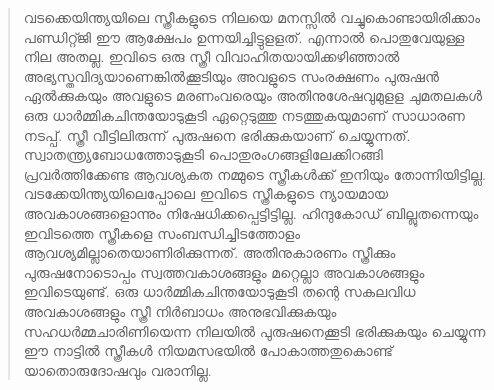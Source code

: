 \begin{quotation}
\noindent വടക്കെയിന്ത്യയിലെ സ്ത്രീകളുടെ നിലയെ മനസ്സിൽ വച്ചുകൊണ്ടായിരിക്കാം പണ്ഡിറ്റ്ജി ഈ ആക്ഷേപം ഉന്നയിച്ചിട്ടുളളത്. എന്നാൽ പൊതുവേയുള്ള നില അതല്ല. ഇവിടെ ഒരു സ്ത്രീ വിവാഹിതയായിക്കഴിഞ്ഞാൽ അഭ്യസ്തവിദ്യയാണെങ്കിൽക്കൂടിയും അവളുടെ സംരക്ഷണം പുരുഷൻ ഏൽക്കുകയും അവളുടെ മരണംവരെയും അതിനുശേഷവുമുളള ചുമതലകൾ ഒരു ധാർമ്മികചിന്തയോടുകൂടി ഏറ്റെടുത്തു നടത്തുകയുമാണ് സാധാരണ നടപ്പ്. സ്ത്രീ വീട്ടിലിരുന്ന് പുരുഷനെ ഭരിക്കുകയാണ് ചെയ്യുന്നത്. സ്വാതന്ത്ര്യബോധത്തോടുകൂടി പൊതുരംഗങ്ങളിലേക്കിറങ്ങി പ്രവർത്തിക്കേണ്ട ആവശ്യകത നമ്മുടെ സ്ത്രീകൾക്ക് ഇനിയും തോന്നിയിട്ടില്ല. വടക്കേയിന്ത്യയിലെപ്പോലെ ഇവിടെ സ്ത്രീകളുടെ ന്യായമായ അവകാശങ്ങളൊന്നും നിഷേധിക്കപ്പെട്ടിട്ടില്ല. ഹിന്ദുകോഡ് ബില്ലുതന്നെയും ഇവിടത്തെ സ്ത്രീകളെ സംബന്ധിച്ചിടത്തോളം ആവശ്യമില്ലാതെയാണിരിക്കുന്നത്. അതിനുകാരണം സ്ത്രീക്കും പുരുഷനോടൊപ്പം സ്വത്തവകാശങ്ങളും മറ്റെല്ലാ അവകാശങ്ങളും ഇവിടെയുണ്ട്. ഒരു ധാർമ്മികചിന്തയോടുകൂടി തന്റെ സകലവിധ അവകാശങ്ങളും സ്ത്രീ നിർബാധം അനുഭവിക്കുകയും സഹധർമ്മചാരിണിയെന്ന നിലയിൽ പുരുഷനെക്കൂടി ഭരിക്കുകയും ചെയ്യുന്ന ഈ നാട്ടിൽ സ്ത്രീകൾ നിയമസഭയിൽ പോകാത്തതുകൊണ്ട് യാതൊരുദോഷവും വരാനില്ല.
\end{quotation}

